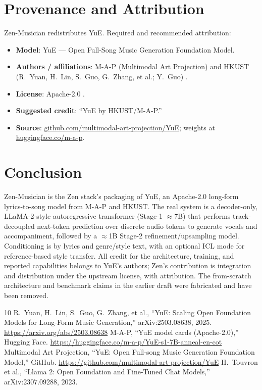 \documentclass[11pt,a4paper]{article}
\begin{document}
\section{Provenance and Attribution}

Zen-Musician redistributes YuE. Required and recommended attribution:

\begin{itemize}
    \item \textbf{Model}: YuE --- Open Full-Song Music Generation Foundation Model.
    \item \textbf{Authors / affiliations}: M-A-P (Multimodal Art Projection) and
    HKUST (R.\ Yuan, H.\ Lin, S.\ Guo, G.\ Zhang, et al.; Y.\ Guo)
    \cite{yuan2025yue}.
    \item \textbf{License}: Apache-2.0 \cite{yuehf}.
    \item \textbf{Suggested credit}: ``YuE by HKUST/M-A-P.''
    \item \textbf{Source}: \href{https://github.com/multimodal-art-projection/YuE}{github.com/multimodal-art-projection/YuE};
    weights at \href{https://huggingface.co/m-a-p}{huggingface.co/m-a-p}.
\end{itemize}

\section{Conclusion}

Zen-Musician is the Zen stack's packaging of YuE, an Apache-2.0 long-form
lyrics-to-song model from M-A-P and HKUST. The real system is a decoder-only,
LLaMA-2-style autoregressive transformer (Stage-1 $\approx$7B) that performs
track-decoupled next-token prediction over discrete audio tokens to generate
vocals and accompaniment, followed by a $\approx$1B Stage-2 refinement/upsampling
model. Conditioning is by lyrics and genre/style text, with an optional ICL mode
for reference-based style transfer. All credit for the architecture, training, and
reported capabilities belongs to YuE's authors; Zen's contribution is integration
and distribution under the upstream license, with attribution. The from-scratch
architecture and benchmark claims in the earlier draft were fabricated and have
been removed.

\begin{thebibliography}{10}
 R.\ Yuan, H.\ Lin, S.\ Guo, G.\ Zhang, et al., ``YuE: Scaling Open Foundation Models for Long-Form Music Generation,'' arXiv:2503.08638, 2025. \url{https://arxiv.org/abs/2503.08638}
 M-A-P, ``YuE model cards (Apache-2.0),'' Hugging Face. \url{https://huggingface.co/m-a-p/YuE-s1-7B-anneal-en-cot}
 Multimodal Art Projection, ``YuE: Open Full-song Music Generation Foundation Model,'' GitHub. \url{https://github.com/multimodal-art-projection/YuE}
 H.\ Touvron et al., ``Llama 2: Open Foundation and Fine-Tuned Chat Models,'' arXiv:2307.09288, 2023.
\end{thebibliography}
\end{document}
